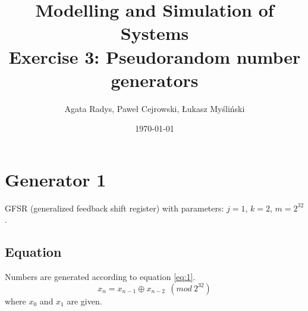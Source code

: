 \documentclass[a4paper,10pt]{article}
\title{Modelling and Simulation of Systems\\ \Large
Exercise 3: Pseudorandom number generators}
\author{Agata Radys, Paweł Cejrowski, Łukasz Myśliński}
\date{\today}
\begin{document}
\maketitle

\section{Generator 1}

GFSR (generalized feedback shift register) with parameters: $j=1$, $k=2$, $m=2^{32}$.
\subsection{Equation}
Numbers are generated according to equation \ref{eq:1}.
\begin{equation}
\label{eq:1}
  x_n = x_{n-1} \oplus x_{n-2}\ \ (mod\ 2^{32})
\end{equation}
where ${x_0}$ and ${x_1}$ are given.
\end{document}
